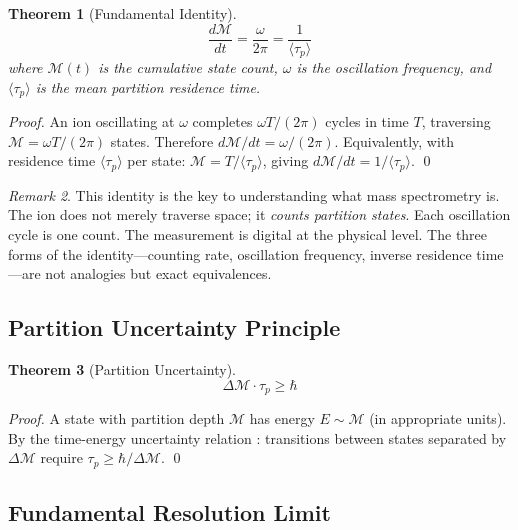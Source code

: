 \documentclass[twocolumn,10pt,a4paper]{article}
\newtheorem{theorem}{Theorem}[section]
\theoremstyle{definition}
\theoremstyle{remark}
\newtheorem{remark}[theorem]{Remark}
\newcommand{\Depth}{\mathcal{M}}
\newcommand{\taup}{\tau_p}
\begin{document}
\begin{theorem}[Fundamental Identity]
\label{thm:fundamental}
\begin{equation}
    \boxed{\frac{d\Depth}{dt} = \frac{\omega}{2\pi} = \frac{1}{\langle\taup\rangle}}
    \label{eq:fundamental}
\end{equation}
where $\Depth(t)$ is the cumulative state count, $\omega$ is the oscillation frequency, and $\langle\taup\rangle$ is the mean partition residence time.
\end{theorem}

\begin{proof}
An ion oscillating at $\omega$ completes $\omega T/(2\pi)$ cycles in time $T$, traversing $\Depth = \omega T/(2\pi)$ states. Therefore $d\Depth/dt = \omega/(2\pi)$. Equivalently, with residence time $\langle\taup\rangle$ per state: $\Depth = T/\langle\taup\rangle$, giving $d\Depth/dt = 1/\langle\taup\rangle$. \qed
\end{proof}

\begin{remark}
This identity is the key to understanding what mass spectrometry is. The ion does not merely traverse space; it \emph{counts partition states}. Each oscillation cycle is one count. The measurement is digital at the physical level. The three forms of the identity---counting rate, oscillation frequency, inverse residence time---are not analogies but exact equivalences.
\end{remark}


\subsection{Partition Uncertainty Principle}

\begin{theorem}[Partition Uncertainty]
\label{thm:uncertainty}
\begin{equation}
    \boxed{\Delta\Depth \cdot \taup \geq \hbar}
    \label{eq:uncertainty}
\end{equation}
\end{theorem}

\begin{proof}
A state with partition depth $\Depth$ has energy $E \sim \Depth$ (in appropriate units). By the time-energy uncertainty relation \citep{mandelstam1991}: transitions between states separated by $\Delta\Depth$ require $\taup \geq \hbar/\Delta\Depth$. \qed
\end{proof}

\subsection{Fundamental Resolution Limit}
\end{document}
